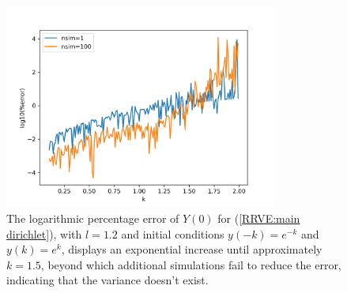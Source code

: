 \documentclass[a4paper,12pt]{article}
\begin{document}
\begin{figure}[h!]
    \centering
    \includegraphics[width=0.8\textwidth]{plots/mainD explosion.png}
    \caption{The logarithmic percentage error of $Y(0)$ for
    (\ref{RRVE:main dirichlet}), with $l=1.2$ and initial conditions
    $y(-k)=e^{-k}$ and $y(k)=e^{k}$, displays an exponential
    increase until approximately $k=1.5$, beyond which additional
    simulations fail to reduce the error, indicating that the variance
    doesn't exist.}
    \label{fig:mainD explosion}
\end{figure}









\end{document}
